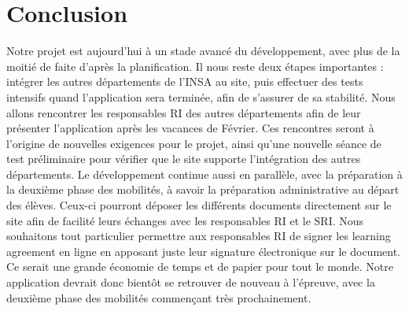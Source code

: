 \chapter{Conclusion}

Notre projet est aujourd'hui à un stade avancé du développement, avec plus de la moitié de faite d'après la planification. Il nous reste deux étapes importantes : intégrer les autres départements de l'INSA au site, puis effectuer des tests intensifs quand l'application sera terminée, afin de s'assurer de sa stabilité.
\bigbreak
Nous allons rencontrer les responsables RI des autres départements afin de leur présenter l'application après les vacances de Février. Ces rencontres seront à l'origine de nouvelles exigences pour le projet, ainsi qu'une nouvelle séance de test préliminaire pour vérifier que le site supporte l'intégration des autres départements. 
\bigbreak
Le développement continue aussi en parallèle, avec la préparation à la deuxième phase des mobilités, à savoir la préparation administrative au départ des élèves. Ceux-ci pourront déposer les différents documents directement sur le site afin de facilité leurs échanges avec les responsables RI et le SRI. Nous souhaitons tout particulier permettre aux responsables RI de signer les learning agreement en ligne en apposant juste leur signature électronique sur le document. Ce serait une grande économie de temps et de papier pour tout le monde. 
\bigbreak
Notre application devrait donc bientôt se retrouver de nouveau à l'épreuve, avec la deuxième phase des mobilités commençant très prochainement.